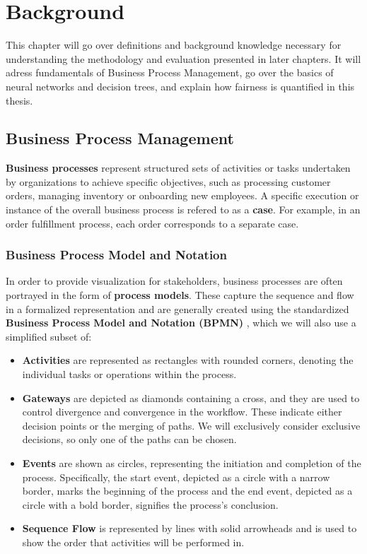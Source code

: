 \chapter{Background}
This chapter will go over definitions and background knowledge
necessary for understanding the methodology and evaluation presented in later chapters.
It will adress fundamentals of Business Process Management, go over the basics of neural networks and decision trees,
and explain how fairness is quantified in this thesis.

\section{Business Process Management}
\textbf{Business processes} represent structured sets of activities
or tasks undertaken by organizations to achieve specific objectives,
such as processing customer orders, managing inventory or onboarding new employees.
A specific execution or instance of the overall business process is refered to as a \textbf{case}.
For example, in an order fulfillment process, each order corresponds to a separate case.

\subsection{Business Process Model and Notation}
In order to provide visualization for stakeholders,
business processes are often portrayed in the form of \textbf{process models}.
These capture the sequence and flow in a formalized representation
and are generally created using the standardized
\textbf{Business Process Model and Notation (BPMN)} \cite{bpmn},
which we will also use a simplified subset of:

\begin{itemize}
\item \textbf{Activities} are represented as rectangles with rounded corners,
denoting the individual tasks or operations within the process.
\item \textbf{Gateways} are depicted as diamonds containing a cross,
and they are used to control divergence and convergence in the workflow.
These indicate either decision points or the merging of paths.
We will exclusively consider exclusive decisions,
so only one of the paths can be chosen.
\item \textbf{Events} are shown as circles,
representing the initiation and completion of the process.
Specifically, the start event,
depicted as a circle with a narrow border, marks the beginning of the process
and the end event, depicted as a circle with a bold border, signifies the process's conclusion.
\item \textbf{Sequence Flow} is represented by lines with solid arrowheads
and is used to show the order that activities will be performed in.
\end{itemize}


